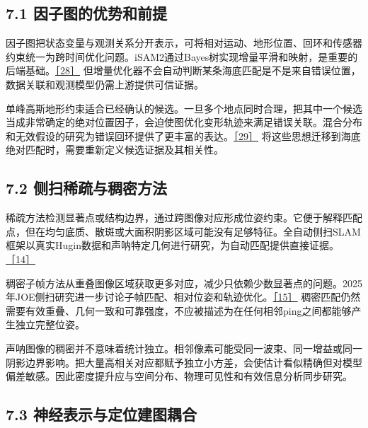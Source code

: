 \hypertarget{ux56e0ux5b50ux56feux7684ux4f18ux52bfux548cux524dux63d0}{%
\subsection{7.1 因子图的优势和前提}\label{ux56e0ux5b50ux56feux7684ux4f18ux52bfux548cux524dux63d0}}

因子图把状态变量与观测关系分开表示，可将相对运动、地形位置、回环和传感器约束统一为跨时间优化问题。iSAM2通过Bayes树实现增量平滑和映射，是重要的后端基础。\href{https://www.borg.cc.gatech.edu/papers/kaess12ijrr.html}{［28］} 但增量优化器不会自动判断某条海底匹配是不是来自错误位置，数据关联和观测模型仍需上游提供可信证据。

单峰高斯地形约束适合已经确认的候选。一旦多个地点同时合理，把其中一个候选当成非常确定的绝对位置因子，会迫使图优化变形轨迹来满足错误关联。混合分布和无效假设的研究为错误回环提供了更丰富的表达。\href{https://april.eecs.umich.edu/media/pdfs/olson2012rss.pdf}{［29］} 将这些思想迁移到海底绝对匹配时，需要重新定义候选证据及其相关性。

\hypertarget{ux4fa7ux626bux7a00ux758fux4e0eux7a20ux5bc6ux65b9ux6cd5}{%
\subsection{7.2 侧扫稀疏与稠密方法}\label{ux4fa7ux626bux7a00ux758fux4e0eux7a20ux5bc6ux65b9ux6cd5}}

稀疏方法检测显著点或结构边界，通过跨图像对应形成位姿约束。它便于解释匹配点，但在均匀底质、散斑或大面积阴影区域可能没有足够特征。全自动侧扫SLAM框架以真实Hugin数据和声呐特定几何进行研究，为自动匹配提供直接证据。\href{https://arxiv.org/abs/2304.01854}{［14］}

稠密子帧方法从重叠图像区域获取更多对应，减少只依赖少数显著点的问题。2025年JOE侧扫研究进一步讨论子帧匹配、相对位姿和轨迹优化。\href{https://arxiv.org/abs/2312.13802}{［15］} 稠密匹配仍然需要有效重叠、几何一致和可靠强度，不应被描述为在任何相邻ping之间都能够产生独立完整位姿。

声呐图像的稠密并不意味着统计独立。相邻像素可能受同一波束、同一增益或同一阴影边界影响。把大量高相关对应都赋予独立小方差，会使估计看似精确但对模型偏差敏感。因此密度提升应与空间分布、物理可见性和有效信息分析同步研究。

\hypertarget{ux795eux7ecfux8868ux793aux4e0eux5b9aux4f4dux5efaux56feux8026ux5408}{%
\subsection{7.3 神经表示与定位建图耦合}\label{ux795eux7ecfux8868ux793aux4e0eux5b9aux4f4dux5efaux56feux8026ux5408}}

